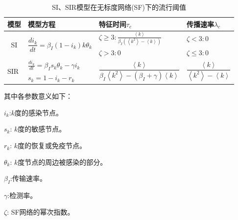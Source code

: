 \documentclass[UTF8]{ctexart}
\begin{document}
\begin{table}[H]
	\centering
	\caption{SI、SIR模型在无标度网络(SF)下的流行阈值}
	\label{SI、SIR模型在无标度网络(SF)下的流行阈值}
	\begin{tabular}{|l|l|l|l|}
		\hline
		模型                                        & 模型方程                  & 特征时间$\tau_{c}$                  & 传播速率$\lambda_{c}$                  \\ \hline
		\multicolumn{1}{|c|}{\multirow{2}{*}{SI}} & \multirow{2}{*}{$\dfrac{di_{k}}{dt}=\beta_{I}(1-i_{k})k\theta_{k}$} & $\zeta \ge 3:\frac{\left\langle k\right\rangle}{\beta_{I}(\left\langle k^{2}\right\rangle-\left\langle k\right\rangle)}$                  & $\zeta < 3:0$                  \\ \cline{3-4} 
		\multicolumn{1}{|c|}{}                   &                    & $\zeta > 3:0$                  & $\zeta \le 3:0$                  \\ \hline
		\multirow{2}{*}{SIR}                       & $\frac{di_{k}}{dt}=\beta_{I}s_{k}\theta_{k}-\gamma i_{k}$                  & \multirow{2}{*}{$\dfrac{\left \langle k\right \rangle}{\beta_{I}\left \langle k^{2}\right \rangle-(\beta_{I}+\gamma)\left \langle k\right \rangle}$} & \multirow{2}{*}{$\dfrac{\left \langle k\right \rangle}{\left \langle k^{2}\right \rangle-\left \langle k\right \rangle}$} \\ \cline{2-2}
		& $s_{k}=1-i_{k}-r_{k}$                  &                    &                    \\ \hline
	\end{tabular}
\end{table}
\par 其中各参数意义如下：

$i_{k}$:$k$度的感染节点。

$s_{k}$: $k$度的敏感节点。

$r_{k}$: $k$度的恢复或免疫节点。

$\theta_{k}$: $k$度节点的周边被感染的部分。

$\beta_{I}$:传输速率。

$\gamma$:检测率。

$\zeta$: SF网络的幂次指数。
\end{document}
